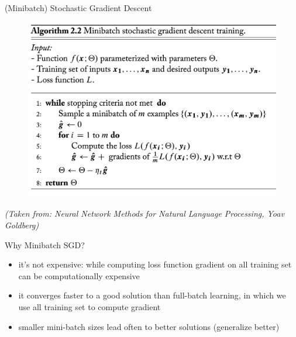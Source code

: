 \begin{frame}{\Large{(Minibatch) Stochastic Gradient Descent}}
\centering
\begin{figure}
    \includegraphics[scale=0.20]{./figures/msgd.png}
\end{figure}
\vspace*{\fill}
\textit{\tiny{(Taken from: Neural Network Methods for Natural Language Processing, Yoav Goldberg)}}
\end{frame}
\begin{frame}{Why Minibatch SGD?}
    \begin{itemize}
        \item<1-> it's not expensive: while computing loss function gradient on all training set can be computationally
expensive 
        \item<2-> it converges faster to a good solution than full-batch learning, in which we use all training set to compute gradient
        \item<3-> smaller mini-batch sizes lead often to better solutions (generalize better)
    \end{itemize}
\end{frame}
